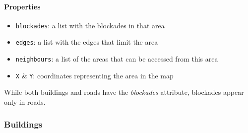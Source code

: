 \documentclass{article}
\begin{document}
\paragraph{Properties}
\begin{itemize}
  \item \texttt{blockades}: a list with the blockades in that area
  \item \texttt{edges}: a list with the edges that limit the area
  \item \texttt{neighbours}: a list of the areas that can be accessed from this area
  \item \texttt{X} \& \texttt{Y}: coordinates representing the area in the map
\end{itemize}

While both buildings and roads have the \emph{blockades} attribute, blockades appear only in roads.
\subsubsection{Buildings}
\end{document}

